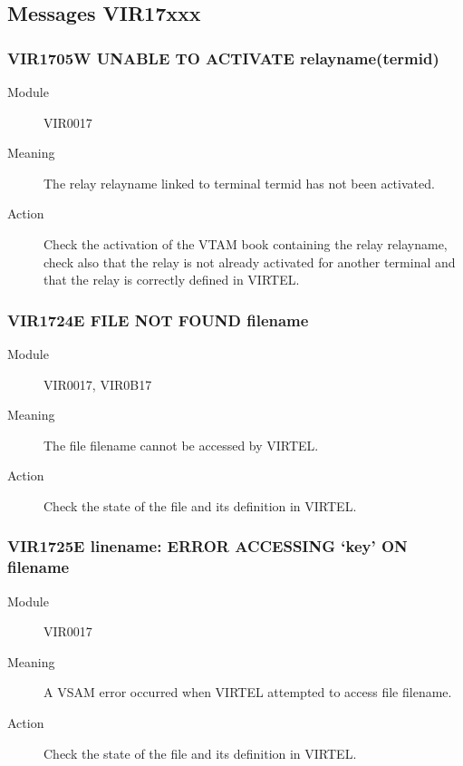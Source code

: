\documentclass[letterpaper,10pt,english]{sphinxmanual}
\begin{document}
\subsection{Messages VIR17xxx}
\label{\detokenize{messages:messages-vir17xxx}}

\subsubsection{VIR1705W UNABLE TO ACTIVATE relayname(termid)}
\label{\detokenize{messages:vir1705w-unable-to-activate-relayname-termid}}\begin{description}
\item[{Module}] \leavevmode
VIR0017

\item[{Meaning}] \leavevmode
The relay relayname linked to terminal termid has not been activated.

\item[{Action}] \leavevmode
Check the activation of the VTAM book containing the relay relayname, check also that the relay is not already activated for another terminal and that the relay is correctly defined in VIRTEL.

\end{description}


\subsubsection{VIR1724E FILE NOT FOUND filename}
\label{\detokenize{messages:vir1724e-file-not-found-filename}}\begin{description}
\item[{Module}] \leavevmode
VIR0017, VIR0B17

\item[{Meaning}] \leavevmode
The file filename cannot be accessed by VIRTEL.

\item[{Action}] \leavevmode
Check the state of the file and its definition in VIRTEL.

\end{description}


\subsubsection{VIR1725E linename: ERROR ACCESSING ‘key’ ON filename}
\label{\detokenize{messages:vir1725e-linename-error-accessing-key-on-filename}}\begin{description}
\item[{Module}] \leavevmode
VIR0017

\item[{Meaning}] \leavevmode
A VSAM error occurred when VIRTEL attempted to access file filename.

\item[{Action}] \leavevmode
Check the state of the file and its definition in VIRTEL.

\end{description}
\end{document}
